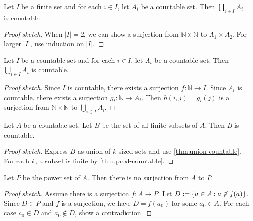 \documentclass[a4paper, 12pt, fleqn]{article}
\begin{document}
\begin{theorem}
\label{thm:prod-countable}
Let $I$ be a finite set and for each $i \in I$, let $A_i$ be a countable set.
Then $\prod_{i \in I} A_i$ is countable.
\end{theorem}
\begin{proof}[Proof sketch]
When $|I| = 2$, we can show a surjection from $\mathbb{N} \times \mathbb{N}$ to $A_1 \times A_2$.
For larger $|I|$, use induction on $|I|$.
\end{proof}

\begin{theorem}
\label{thm:union-countable}
Let $I$ be a countable set and for each $i \in I$, let $A_i$ be a countable set.
Then $\bigcup_{i \in I} A_i$ is countable.
\end{theorem}
\begin{proof}[Proof sketch]
Since $I$ is countable, there exists a surjection $f: \mathbb{N} \to I$.
Since $A_i$ is countable, there exists a surjection $g_i: \mathbb{N} \to A_i$.
Then $h(i, j) = g_i(j)$ is a surjection from $\mathbb{N} \times \mathbb{N}$ to $\bigcup_{i \in I} A_i$.
\end{proof}

\begin{theorem}
\label{thm:finite-subsets-countable}
Let $A$ be a countable set.
Let $B$ be the set of all finite subsets of $A$. Then $B$ is countable.
\end{theorem}
\begin{proof}[Proof sketch]
Express $B$ as union of $k$-sized sets and use \cref{thm:union-countable}.
For each $k$, a subset is finite by \cref{thm:prod-countable}.
\end{proof}

\begin{theorem}
Let $P$ be the power set of $A$.
Then there is no surjection from $A$ to $P$.
\end{theorem}
\begin{proof}[Proof sketch]
Assume there is a surjection $f: A \to P$.
Let $D := \{a \in A: a \not\in f(a)\}$.
Since $D \in P$ and $f$ is a surjection, we have $D = f(a_0)$ for some $a_0 \in A$.
For each case $a_0 \in D$ and $a_0 \not\in D$, show a contradiction.
\end{proof}
\end{document}

